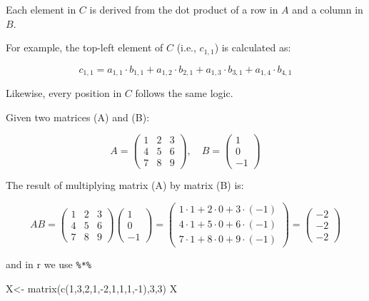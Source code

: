 \documentclass[
  letterpaper,
  DIV=11,
  numbers=noendperiod]{scrartcl}
\newenvironment{Shaded}{\begin{snugshade}}{\end{snugshade}}
\newcommand{\DecValTok}[1]{\textcolor[rgb]{0.68,0.00,0.00}{#1}}
\newcommand{\FunctionTok}[1]{\textcolor[rgb]{0.28,0.35,0.67}{#1}}
\newcommand{\NormalTok}[1]{\textcolor[rgb]{0.00,0.23,0.31}{#1}}
\newcommand{\OtherTok}[1]{\textcolor[rgb]{0.00,0.23,0.31}{#1}}
\newcommand{\SpecialCharTok}[1]{\textcolor[rgb]{0.37,0.37,0.37}{#1}}
\begin{document}
Each element in \(C\) is derived from the dot product of a row in \(A\)
and a column in \(B\).

For example, the top-left element of \(C\) (i.e., \(c_{1,1}\)) is
calculated as:

\[
c_{1,1} = a_{1,1} \cdot b_{1,1} + a_{1,2} \cdot b_{2,1} + a_{1,3} \cdot b_{3,1} + a_{1,4} \cdot b_{4,1}
\]

Likewise, every position in \(C\) follows the same logic.

Given two matrices (A) and (B):

\[
A = \begin{pmatrix}
1 & 2 & 3 \\
4 & 5 & 6 \\
7 & 8 & 9
\end{pmatrix}, \quad
B = \begin{pmatrix}
1 \\
0 \\
-1
\end{pmatrix}
\]

The result of multiplying matrix (A) by matrix (B) is:

\[
AB = \begin{pmatrix}
1 & 2 & 3 \\
4 & 5 & 6 \\
7 & 8 & 9
\end{pmatrix}
\begin{pmatrix}
1 \\
0 \\
-1
\end{pmatrix}
= \begin{pmatrix}
1 \cdot 1 + 2 \cdot 0 + 3 \cdot (-1) \\
4 \cdot 1 + 5 \cdot 0 + 6 \cdot (-1) \\
7 \cdot 1 + 8 \cdot 0 + 9 \cdot (-1)
\end{pmatrix}
= \begin{pmatrix}
-2 \\
-2 \\
-2
\end{pmatrix}
\]

and in r we use \texttt{\%*\%}

\begin{Shaded}
\begin{Highlighting}[]
\NormalTok{X}\OtherTok{\textless{}{-}} \FunctionTok{matrix}\NormalTok{(}\FunctionTok{c}\NormalTok{(}\DecValTok{1}\NormalTok{,}\DecValTok{3}\NormalTok{,}\DecValTok{2}\NormalTok{,}\DecValTok{1}\NormalTok{,}\SpecialCharTok{{-}}\DecValTok{2}\NormalTok{,}\DecValTok{1}\NormalTok{,}\DecValTok{1}\NormalTok{,}\DecValTok{1}\NormalTok{,}\SpecialCharTok{{-}}\DecValTok{1}\NormalTok{),}\DecValTok{3}\NormalTok{,}\DecValTok{3}\NormalTok{)}
\NormalTok{X}
\end{Highlighting}
\end{Shaded}
\end{document}
